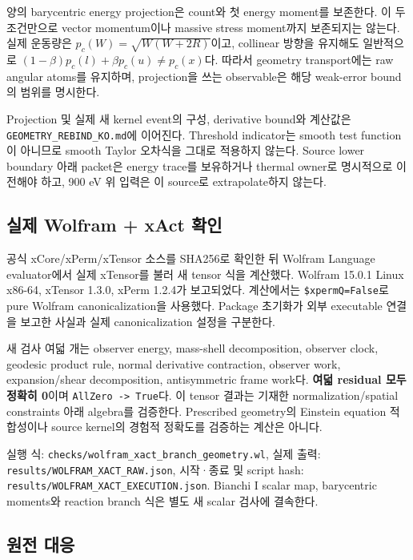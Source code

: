 양의 barycentric energy projection은 count와 첫 energy moment를 보존한다. 이 두 조건만으로 vector momentum이나 massive stress moment까지 보존되지는 않는다. 실제 운동량은 \(p_c(W)=\sqrt{W(W+2R)}\)이고, collinear 방향을 유지해도 일반적으로 \((1-\beta)p_c(l)+\beta p_c(u)\ne p_c(x)\)다. 따라서 geometry transport에는 raw angular atoms를 유지하며, projection을 쓰는 observable은 해당 weak-error bound의 범위를 명시한다.

Projection 및 실제 새 kernel event의 구성, derivative bound와 계산값은 \texttt{GEOMETRY\_REBIND\_KO.md}에 이어진다. Threshold indicator는 smooth test function이 아니므로 smooth Taylor 오차식을 그대로 적용하지 않는다. Source lower boundary 아래 packet은 energy trace를 보유하거나 thermal owner로 명시적으로 이전해야 하고, 900 eV 위 입력은 이 source로 extrapolate하지 않는다.

\hypertarget{uxc2e4uxc81c-wolfram-xact-uxd655uxc778}{%
\subsection{실제 Wolfram + xAct 확인}\label{uxc2e4uxc81c-wolfram-xact-uxd655uxc778}}

공식 xCore/xPerm/xTensor 소스를 SHA256로 확인한 뒤 Wolfram Language evaluator에서 실제 xTensor를 불러 새 tensor 식을 계산했다. Wolfram 15.0.1 Linux x86-64, xTensor 1.3.0, xPerm 1.2.4가 보고되었다. 계산에서는 \texttt{\$xpermQ=False}로 pure Wolfram canonicalization을 사용했다. Package 초기화가 외부 executable 연결을 보고한 사실과 실제 canonicalization 설정을 구분한다.

새 검사 여덟 개는 observer energy, mass-shell decomposition, observer clock, geodesic product rule, normal derivative contraction, observer work, expansion/shear decomposition, antisymmetric frame work다. \textbf{여덟 residual 모두 정확히 0}이며 \texttt{AllZero\ -\textgreater{}\ True}다. 이 tensor 결과는 기재한 normalization/spatial constraints 아래 algebra를 검증한다. Prescribed geometry의 Einstein equation 적합성이나 source kernel의 경험적 정확도를 검증하는 계산은 아니다.

실행 식: \nolinkurl{checks/wolfram_xact_branch_geometry.wl}, 실제 출력: \nolinkurl{results/WOLFRAM_XACT_RAW.json}, 시작·종료 및 script hash: \nolinkurl{results/WOLFRAM_XACT_EXECUTION.json}. Bianchi I scalar map, barycentric moments와 reaction branch 식은 별도 새 scalar 검사에 결속한다.

\hypertarget{uxc6d0uxc804-uxb300uxc751}{%
\subsection{원전 대응}\label{uxc6d0uxc804-uxb300uxc751}}

